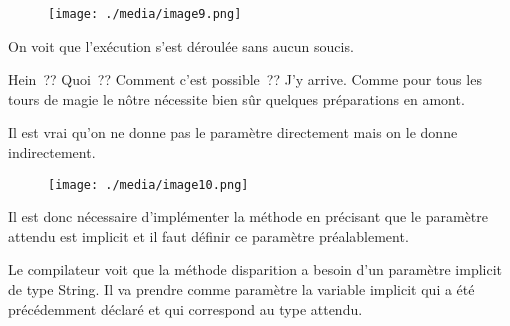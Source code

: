 \documentclass[12pt]{article}
\begin{document}

\begin{figure}[H]
	\begin{Center}
		\texttt{[image: ./media/image9.png]}
	\end{Center}
\end{figure}



\par


\vspace{\baselineskip}
On voit que l’exécution s’est déroulée sans aucun soucis. \par

Hein ?? Quoi ?? Comment c’est possible ?? J’y arrive. Comme pour tous les tours de magie le nôtre nécessite bien sûr quelques préparations en amont. \par

Il est vrai qu’on ne donne pas le paramètre directement mais on le donne indirectement.\par


\vspace{\baselineskip}



\begin{figure}[H]
	\begin{Center}
		\texttt{[image: ./media/image10.png]}
	\end{Center}
\end{figure}



\par


\vspace{\baselineskip}

\vspace{\baselineskip}
Il est donc nécessaire d’implémenter la méthode en précisant que le paramètre attendu est implicit et il faut définir ce paramètre préalablement. \par

Le compilateur voit que la méthode disparition a besoin d’un paramètre implicit de type String. Il va prendre comme paramètre la variable implicit qui a été précédemment déclaré et qui correspond au type attendu.\par
\end{document}
